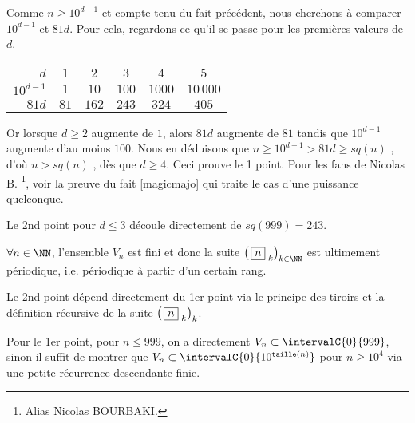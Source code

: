 \begin{proof*}
	Comme $n \geqslant 10^{d-1}$ et compte tenu du fait précédent, nous cherchons à comparer $10^{d-1}$ et $81d$.
	Pour cela, regardons ce qu'il se passe pour les premières valeurs de $d$.

	\smallskip
	\begin{center}
		\begin{tabular}{|r|c|c|c|c|c|}
			\hline
				$d$        & $1$  & $2$   & $3$   & $4$    & $5$        \\
			\hline
				$10^{d-1}$ & $1$  & $10$  & $100$ & $1000$ & $10\,000$  \\
			\hline
				$81d$      & $81$ & $162$ & $243$ & $324$  & $405$      \\
			\hline
		\end{tabular}
	\end{center}
	\smallskip
	
	Or lorsque $d \geqslant 2$ augmente de $1$, alors $81d$ augmente de $81$ tandis que $10^{d-1}$ augmente d'au moins $100$.
	Nous en déduisons que $n \geqslant 10^{d-1} > 81d \geqslant sq(n)$ , d'où $n > sq(n)$ , dès que $d \geqslant 4$.
	Ceci prouve le 1\ier{} point.
	Pour les fans de Nicolas B.
	\footnote{
		Alias Nicolas BOURBAKI.
	}, 
	voir la preuve  du fait \ref{magicmajo} qui traite le cas d'une puissance quelconque.


	\bigskip
	
	Le 2nd point pour $d \leqslant 3$ découle directement de $sq(999) = 243$.
\end{proof*}




\medskip

\begin{fact}
	$\forall n \in \NN$, l'ensemble $V_n$ est fini et donc la suite $\left( \, \sqseq{n}{k} \right)_{k \in \NN}$ est ultimement périodique, i.e. périodique à partir d'un certain rang.
\end{fact}

\begin{proof*}
	Le 2nd point dépend directement du 1er point via le principe des tiroirs et la définition récursive de la suite $\left( \, \fbox{$n$}_{\,\,k} \right)_k$.
	
	\medskip
	
	Pour le 1er point, pour $n \leqslant 999$, on a directement $V_n \subset \intervalC{0}{999}$,
	sinon il suffit de montrer que $V_n \subset \intervalC{0}{10^{\taille(n)}}$ pour $n \geqslant 10^4$ via une petite récurrence descendante finie.
\end{proof*}